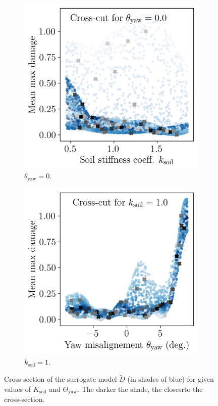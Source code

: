 \begin{figure}[h!]
    \centering
    \begin{subfigure}[b]{0.38\linewidth}
        \includegraphics[width=\linewidth]{./part3/figures/OWT/dam_vs_soil_surrogate.png}
        \caption{$\theta_{\mathrm{yaw}}=0$.}
    \end{subfigure}
    \begin{subfigure}[b]{0.38\linewidth}
        \includegraphics[width=\linewidth]{./part3/figures/OWT/dam_vs_yaw_surrogate.png}
        \caption{$k_{\mathrm{soil}}=1$.}
    \end{subfigure}
    \caption{Cross-section of the surrogate model $\widetilde{D}$ (in shades of blue) for given values of $K_{\mathrm{soil}}$ and $\Theta_{\mathrm{yaw}}$. The darker the shade, the closesrto the cross-section.}
    \label{fig:owt_surrogate}
\end{figure}

